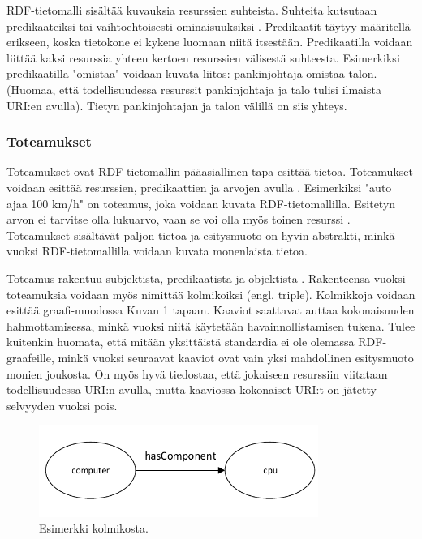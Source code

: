 \documentclass[finnish, 12pt, a4paper, elec, utf8, pdfa, online]{aaltothesis}
\begin{document}
RDF-tietomalli sisältää kuvauksia resurssien suhteista. Suhteita kutsutaan predikaateiksi tai vaihtoehtoisesti ominaisuuksiksi \cite{Antoniou}. Predikaatit täytyy määritellä erikseen, koska tietokone ei kykene luomaan niitä itsestään. Predikaatilla voidaan liittää kaksi resurssia yhteen kertoen resurssien välisestä suhteesta. Esimerkiksi predikaatilla "omistaa" voidaan kuvata liitos: pankinjohtaja omistaa talon. (Huomaa, että todellisuudessa resurssit pankinjohtaja ja talo tulisi ilmaista URI:en avulla). Tietyn pankinjohtajan ja talon välillä on siis yhteys.

\subsubsection{Toteamukset}

Toteamukset ovat RDF-tietomallin pääasiallinen tapa esittää tietoa. Toteamukset voidaan esittää resurssien, predikaattien ja arvojen avulla \cite{Antoniou}. Esimerkiksi "auto ajaa 100 km/h" on toteamus, joka voidaan kuvata RDF-tietomallilla. Esitetyn arvon ei tarvitse olla lukuarvo, vaan se voi olla myös toinen resurssi \cite{Antoniou}\cite{IEEE_XML}. Toteamukset sisältävät paljon tietoa ja esitysmuoto on hyvin abstrakti, minkä vuoksi RDF-tietomallilla voidaan kuvata monenlaista tietoa.

Toteamus rakentuu subjektista, predikaatista ja objektista \cite{lassila_dissertion}. Rakenteensa vuoksi toteamuksia voidaan myös nimittää kolmikoiksi (engl. triple). Kolmikkoja voidaan esittää graafi-muodossa Kuvan 1 tapaan. Kaaviot saattavat auttaa kokonaisuuden hahmottamisessa, minkä vuoksi niitä käytetään havainnollistamisen tukena. Tulee kuitenkin huomata, että mitään yksittäistä standardia ei ole olemassa RDF-graafeille, minkä vuoksi seuraavat kaaviot ovat vain yksi mahdollinen esitysmuoto monien joukosta. On myös hyvä tiedostaa, että jokaiseen resurssiin viitataan todellisuudessa URI:n avulla, mutta kaaviossa kokonaiset URI:t on jätetty selvyyden vuoksi pois.

\begin{figure}[htb]
\centering
\includegraphics[height=3cm]{images/RDF-triplet.pdf}
\caption{Esimerkki kolmikosta. \label{images/RDF-triplet1}}
\end{figure}
\end{document}
